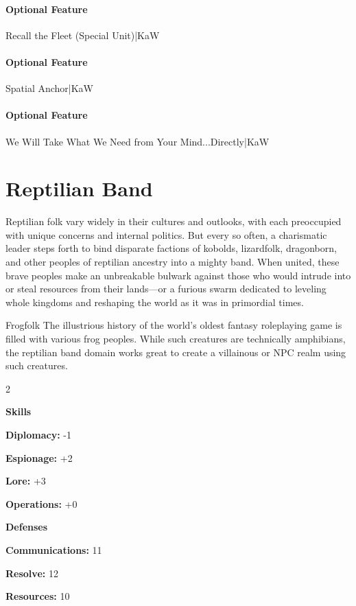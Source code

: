 \documentclass[10pt,a4paper,twoside,bg=print,twocolumn,openany,nodeprecatedcode]{dndbook}
\begin{document}
\paragraph{Optional Feature}
Recall the Fleet (Special Unit)|KaW

\paragraph{Optional Feature}
Spatial Anchor|KaW

\paragraph{Optional Feature}
We Will Take What We Need from Your Mind...Directly|KaW

\section{Reptilian Band}
Reptilian folk vary widely in their cultures and outlooks, with each preoccupied with unique concerns and internal politics. But every so often, a charismatic leader steps forth to bind disparate factions of kobolds, lizardfolk, dragonborn, and other peoples of reptilian ancestry into a mighty band. When united, these brave peoples make an unbreakable bulwark against those who would intrude into or steal resources from their lands—or a furious swarm dedicated to leveling whole kingdoms and reshaping the world as it was in primordial times.

\begin{DndSidebar}[float=!b]{Frogfolk}
The illustrious history of the world's oldest fantasy roleplaying game is filled with various frog peoples. While such creatures are technically amphibians, the reptilian band domain works great to create a villainous or NPC realm using such creatures.



\end{DndSidebar}


\begin{itemize}
\begin{multicols}{2}
\item \textbf{Skills}
\item \textbf{Diplomacy:} -1
\item \textbf{Espionage:} +2
\item \textbf{Lore:} +3
\item \textbf{Operations:} +0
\item \textbf{Defenses}
\item \textbf{Communications:} 11
\item \textbf{Resolve:} 12
\item \textbf{Resources:} 10
\end{multicols}

\end{itemize}
\end{document}
